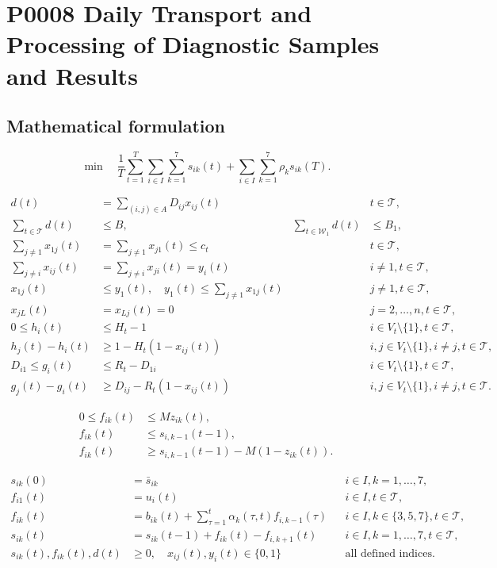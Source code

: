 \documentclass[10pt]{article}
\begin{document}
\section*{P0008 Daily Transport and Processing of Diagnostic Samples and Results}
\subsection*{Mathematical formulation}
\begin{equation}
\min\quad \frac1T\sum_{t=1}^T\sum_{i\in I}\sum_{k=1}^7s_{ik}(t)+\sum_{i\in I}\sum_{k=1}^7\rho_k s_{ik}(T).
\end{equation}

\begin{align}
d(t)&=\sum_{(i,j)\in A}D_{ij}x_{ij}(t) && t\in\mathcal T,\\
\sum_{t\in\mathcal T}d(t)&\leq B,&\sum_{t\in\mathcal W_1}d(t)&\leq B_1,\\
\sum_{j\ne1}x_{1j}(t)&=\sum_{j\ne1}x_{j1}(t)\leq c_t &&t\in\mathcal T,\\
\sum_{j\ne i}x_{ij}(t)&=\sum_{j\ne i}x_{ji}(t)=y_i(t) && i\ne1,t\in\mathcal T,\\
x_{1j}(t)&\leq y_1(t),\quad y_1(t)\leq\sum_{j\ne1}x_{1j}(t)&&j\ne1,t\in\mathcal T,\\
x_{jL}(t)&=x_{Lj}(t)=0&&j=2,\ldots,n,t\in\mathcal T,\\
0\leq h_i(t)&\leq H_t-1 && i\in V_t\setminus\{1\},t\in\mathcal T,\\
h_j(t)-h_i(t)&\geq1-H_t(1-x_{ij}(t))&& i,j\in V_t\setminus\{1\},i\ne j,t\in\mathcal T,\\
D_{i1}\leq g_i(t)&\leq R_t-D_{1i}&& i\in V_t\setminus\{1\},t\in\mathcal T,\\
g_j(t)-g_i(t)&\geq D_{ij}-R_t(1-x_{ij}(t))&&i,j\in V_t\setminus\{1\},i\ne j,t\in\mathcal T.
\end{align}

\begin{align}
0\leq f_{ik}(t)&\leq M z_{ik}(t),\\
f_{ik}(t)&\leq s_{i,k-1}(t-1),\\
f_{ik}(t)&\geq s_{i,k-1}(t-1)-M(1-z_{ik}(t)).
\end{align}

\begin{align}
s_{ik}(0)&=\bar s_{ik} && i\in I,k=1,\ldots,7,\\
f_{i1}(t)&=u_i(t) &&i\in I,t\in\mathcal T,\\
f_{ik}(t)&=b_{ik}(t)+\sum_{\tau=1}^{t}\alpha_k(\tau,t)f_{i,k-1}(\tau)&&i\in I,k\in\{3,5,7\},t\in\mathcal T,\\
s_{ik}(t)&=s_{ik}(t-1)+f_{ik}(t)-f_{i,k+1}(t)&&i\in I,k=1,\ldots,7,t\in\mathcal T,\\
s_{ik}(t),f_{ik}(t),d(t)&\geq0,\quad x_{ij}(t),y_i(t)\in\{0,1\}&&\text{all defined indices}.
\end{align}
\end{document}
